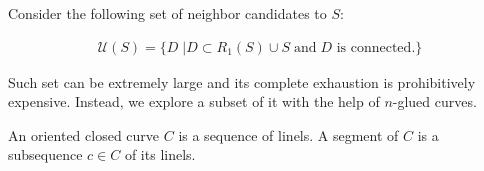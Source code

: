 \documentclass[runningheads]{llncs}
\begin{document}
Consider the following set of neighbor candidates to $S$:

\begin{align*}
\mathcal{U}(S) = \{ D \; | D \subset R_1(S) \cup S \; \text{and} \; \text{$D$ is connected}. \}
\end{align*}


Such set can be extremely large and its complete exhaustion is prohibitively expensive.  Instead, we explore a subset of it with the help of $n$-glued curves.

An oriented closed curve $C$ is a sequence of linels. A segment of $C$ is a subsequence $c \in C$ of its linels.

\begin{figure}
\center
	\hspace{40pt}%
	\subfloat[\label{}]{%
}
\end{figure}
\end{document}
